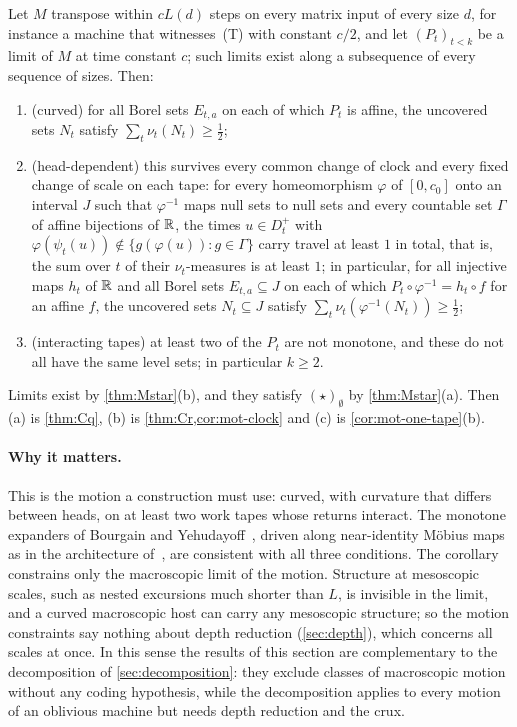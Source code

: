 \begin{corollary}\label{cor:mot-design}
\notformalized
Let $M$ transpose within $cL(d)$ steps on every matrix input of every size $d$, for instance a machine that
witnesses~(T) with constant $c/2$, and let $(P_t)_{t<k}$ be a limit of $M$ at time constant $c$; such limits exist along
a subsequence of every sequence of sizes. Then:
\begin{enumerate}[label=(\alph*)]
\item (curved) for all Borel sets $E_{t,a}$ on each of which $P_t$ is affine, the uncovered sets $N_t$ satisfy
$\sum_t\nu_t(N_t)\ge\frac12$;
\item (head-dependent) this survives every common change of clock and every fixed change of scale on each tape: for
every homeomorphism $\varphi$ of $[0,c_0]$ onto an interval $J$ such that $\varphi^{-1}$ maps null sets to null sets and
every countable set $\Gamma$ of affine bijections of $\mathbb{R}$, the times $u\in D^+_t$ with
$\varphi(\psi_t(u))\notin\{g(\varphi(u)):g\in\Gamma\}$ carry travel at least $1$ in total, that is, the sum over $t$
of their $\nu_t$-measures is at least $1$; in particular, for all
injective maps $h_t$ of $\mathbb{R}$ and all Borel sets $E_{t,a}\subseteq J$ on each of which $P_t\circ\varphi^{-1}=h_t\circ f$
for an affine $f$, the uncovered sets $N_t\subseteq J$ satisfy $\sum_t\nu_t(\varphi^{-1}(N_t))\ge\frac12$;
\item (interacting tapes) at least two of the $P_t$ are not monotone, and these do not all have the same level sets;
in particular
$k\ge2$.
\end{enumerate}
\end{corollary}

\begin{informalproof}
Limits exist by \cref{thm:Mstar}(b), and they satisfy $(\star)_\emptyset$ by \cref{thm:Mstar}(a). Then (a) is
\cref{thm:Cq}, (b) is \cref{thm:Cr,cor:mot-clock} and (c) is \cref{cor:mot-one-tape}(b).
\end{informalproof}

\paragraph{Why it matters.} This is the motion a construction must use: curved, with curvature that differs between
heads, on at least two work tapes whose returns interact. The monotone expanders of Bourgain and
Yehudayoff~\cite{BourgainYehudayoff2013}, driven along near-identity M\"obius maps as in the architecture
of~\cite[Section~13]{FirstPaper2026}, are consistent with all three conditions. The corollary constrains only the
macroscopic limit of the motion. Structure at mesoscopic scales, such as nested excursions much shorter than $L$, is
invisible in the limit, and a curved macroscopic host can carry any mesoscopic structure; so the motion constraints say
nothing about depth reduction (\cref{sec:depth}), which concerns all scales at once. In this sense the results of this
section are complementary to the decomposition of \cref{sec:decomposition}: they exclude classes of macroscopic motion
without any coding hypothesis, while the decomposition applies to every motion of an oblivious machine but needs depth
reduction and the crux.
